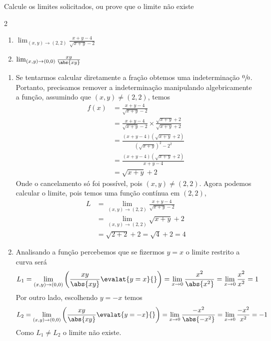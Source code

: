 \documentclass[a4paper,12pt,fleqn]{article}
\begin{document}
Calcule os limites solicitados, ou prove que o limite não existe
\begin{multicols}{2}
  \begin{enumerate}
    \item[{a)}] \(\lim_{(x, y)\to(2, 2)} \frac{x+y-4}{\sqrt{x+y}-2}\)
    \item[{b)}] \(\lim_{(x, y)\to(0, 0)} \frac{xy}{\abs{xy}}\)
  \end{enumerate}
\end{multicols}

\begin{answer}
  \vspace{-1,5\baselineskip}
  \begin{enumerate}
    \item[a)]
    Se tentarmos calcular diretamente a fração obtemos uma
    indeterminação $\sfrac{0}{0}$.
    Portanto, precisamos remover a indeterminação manipulando
    algebricamente a função,
    assumindo que $(x, y)\neq(2, 2)$, temos
    \begin{align*}
      f(x) & = \frac{x+y-4}{\sqrt{x+y}-2} \\[2mm]
           & = \frac{x+y-4}{\sqrt{x+y}-2} \times
               \frac{\sqrt{x+y}+2}{\sqrt{x+y}+2}  \\[2mm]
           & = \frac{(x+y-4)\left(\sqrt{x+y}+2\right)}
                    {\left(\sqrt{x+y}\right)^2 - 2^2}  \\[2mm]
           & = \frac{(x+y-4)\left(\sqrt{x+y}+2\right)}{x+y-4}  \\[2mm]
           & = \sqrt{x+y}+2
    \end{align*}
    Onde o cancelamento só foi possível, pois $(x, y)\neq(2, 2)$.
    Agora podemos calcular o limite, pois temos uma função contínua em $(2, 2)$,
    \begin{align*}
      L & = \lim_{(x, y)\to(2, 2)} \frac{x+y-4}{\sqrt{x+y}-2} \\[2mm]
        & = \lim_{(x, y)\to(2, 2)} \sqrt{x+y}+2 \\[2mm]
        & = \sqrt{2+2}+2 = \sqrt{4} + 2 = 4
    \end{align*}

    \item[b)]
      Analisando a função percebemos que se fizermos $y=x$ o limite restrito
      a curva será
      \[
        L_1
        = \lim_{(x, y)\to(0, 0)}
          \left(\frac{xy}{\abs{xy}} \evalat{y=x}{} \right)
        = \lim_{x\to 0} \frac{x^2}{\abs{x^2}}
        = \lim_{x\to 0} \frac{x^2}{x^2}
        = 1
      \]
      Por outro lado, escolhendo $y=-x$ temos
      \[
        L_2
        = \lim_{(x, y)\to(0, 0)}
          \left(\frac{xy}{\abs{xy}} \evalat{y=-x}{} \right)
        = \lim_{x\to 0} \frac{-x^2}{\abs{-x^2}}
        = \lim_{x\to 0} \frac{-x^2}{x^2}
        = -1
      \]
      Como $L_1\neq L_2$ o limite não existe.
  \end{enumerate}
  \clearpage
\end{answer}
\end{document}
